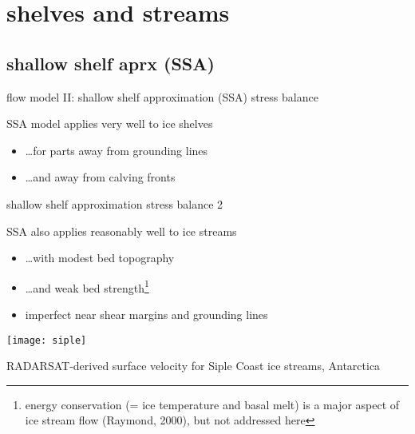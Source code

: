 
\section{shelves and streams}


\subsection{shallow shelf aprx (SSA)}

\begin{frame}{flow model II: shallow shelf approximation (SSA) stress balance}
  
SSA model applies very well to \alert{ice shelves}
\begin{itemize}
\item \dots for parts away from grounding lines
\item \dots and away from calving fronts
\end{itemize}

\end{frame}


\begin{frame}{shallow shelf approximation stress balance 2}

SSA also applies reasonably well to \alert{ice streams}
\begin{itemize}
\item \dots with modest bed topography
\item \dots and weak bed strength\footnote{energy conservation (= ice temperature and basal melt) is a major aspect of ice stream flow (Raymond, 2000)\nocite{Raymondenergy}, but not addressed here}
\item imperfect near shear margins and grounding lines
\end{itemize}

\begin{center}
  \texttt{[image: siple]}

\tiny RADARSAT-derived surface velocity for Siple Coast ice streams, Antarctica 
\end{center}
\end{frame}


